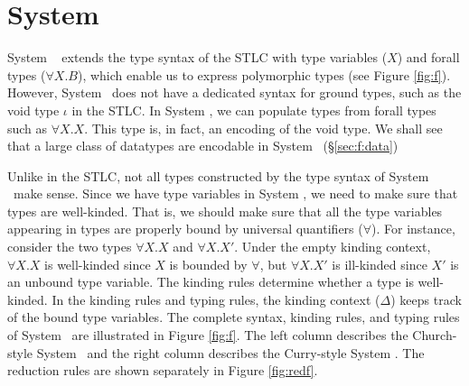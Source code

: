 \section{System \F} \label{sec:f}
System \F\ \cite{Gir71} extends the type syntax of the STLC with
type variables ($X$) and forall types ($\forall X.B$), which enable us
to express polymorphic types (see Figure \ref{fig:f}). However,
System \F\ does not have a dedicated syntax for ground types, such as
the void type $\iota$ in the STLC. In System \F, we can populate types
from forall types such as $\forall X.X$. This type is, in fact,
an encoding of the void type. We shall see that a large class of datatypes
are encodable in System \F\ (\S\ref{sec:f:data})

Unlike in the STLC, not all types constructed by the type syntax of System \F\
make sense. Since we have type variables in System \F, we need to
make sure that types are well-kinded. That is, we should make sure
that all the type variables appearing in types are properly bound by
universal quantifiers ($\forall$). For instance, consider the two types
$\forall X.X$ and $\forall X.X'$. Under the empty kinding context,
$\forall X.X$ is well-kinded since $X$ is bounded by $\forall$, but
$\forall X.X'$ is ill-kinded since $X'$ is an unbound type variable.
The kinding rules determine whether a type is well-kinded.
In the kinding rules and typing rules, the kinding context ($\Delta$)
keeps track of the bound type variables. The complete syntax, kinding rules,
and typing rules of System \F\ are illustrated in Figure \ref{fig:f}.
The left column describes the Church-style System \F\ and the right
column describes the Curry-style System \F. The reduction rules are
shown separately in Figure \ref{fig:redf}.

